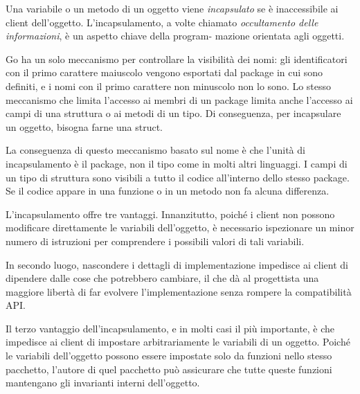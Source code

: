 Una variabile o un metodo di un oggetto viene \textit{incapsulato} se è inaccessibile ai client dell'oggetto.
L'incapsulamento, a volte chiamato \textit{occultamento delle informazioni}, è un aspetto chiave della program- mazione orientata agli oggetti.

Go ha un solo meccanismo per controllare la visibilità dei nomi: gli identificatori con il primo carattere maiuscolo vengono esportati dal package in cui sono definiti, e i nomi con il primo carattere non minuscolo non lo sono.
Lo stesso meccanismo che limita l'accesso ai membri di un package limita anche l'accesso ai campi di una struttura o ai metodi di un tipo.
Di conseguenza, per incapsulare un oggetto, bisogna farne una struct.

La conseguenza di questo meccanismo basato sul nome è che l'unità di incapsulamento è il package, non il tipo come in molti altri linguaggi.
I campi di un tipo di struttura sono visibili a tutto il codice all'interno dello stesso package.
Se il codice appare in una funzione o in un metodo non fa alcuna differenza.

L'incapsulamento offre tre vantaggi.
Innanzitutto, poiché i client non possono modificare direttamente le variabili dell'oggetto, è necessario ispezionare un minor numero di istruzioni per comprendere i possibili valori di tali variabili.

In secondo luogo, nascondere i dettagli di implementazione impedisce ai client di dipendere dalle cose che potrebbero cambiare, il che dà al progettista una maggiore libertà di far evolvere l'implementazione senza rompere la compatibilità API\@.

Il terzo vantaggio dell'incapsulamento, e in molti casi il più importante, è che impedisce ai client di impostare arbitrariamente le variabili di un oggetto.
Poiché le variabili dell'oggetto possono essere impostate solo da funzioni nello stesso pacchetto, l'autore di quel pacchetto può assicurare che tutte queste funzioni mantengano gli invarianti interni dell'oggetto.